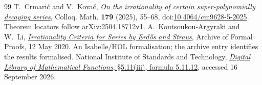 \begin{thebibliography}{99}
 T.~Crmari\'{c} and V.~Kova\v{c},
  \href{https://arxiv.org/abs/2504.18712v1}
  {\emph{On the irrationality of certain super-polynomially decaying series}},
  Colloq. Math. \textbf{179} (2025), 55--68,
  doi:\href{https://doi.org/10.4064/cm9628-5-2025}{10.4064/cm9628-5-2025}.
  Theorem locators follow arXiv:2504.18712v1.
 A.~Koutsoukou-Argyraki and W.~Li,
  \href{https://isa-afp.org/entries/Irrational_Series_Erdos_Straus.html}
  {\emph{Irrationality Criteria for Series by Erd\H{o}s and Straus}},
  Archive of Formal Proofs, 12 May 2020. An Isabelle/HOL formalisation;
  the archive entry identifies the results formalised.
 National Institute of Standards and Technology,
  \href{https://dlmf.nist.gov/5.11.E12}{\emph{Digital Library of Mathematical
  Functions}, \S5.11(iii), formula 5.11.12}, accessed 16 September 2026.
\end{thebibliography}


